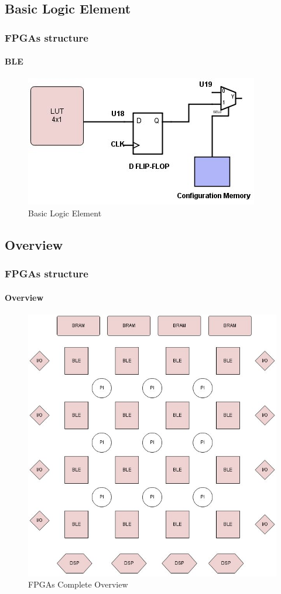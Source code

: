 \documentclass{beamer}
\begin{document}
\begin{frame}
\subsection{Basic Logic Element}
\frametitle{FPGAs structure}
\framesubtitle{BLE}

\begin{figure}
\includegraphics[width=.9\linewidth,left]{lutBle.jpg}
\caption{Basic Logic Element}
\end{figure}

\end{frame}
\begin{frame}
\subsection{Overview}
\frametitle{FPGAs structure}
\framesubtitle{Overview}

\begin{figure}
\includegraphics[width=.58\linewidth,center]{full.jpg}
\caption{FPGAs Complete Overview}
\end{figure}

\end{frame}
\end{document}
